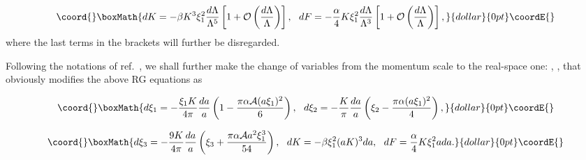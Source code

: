 \documentclass[a4paper,12pt]{article}
\begin{document}
$$\coord{}\boxMath{
dK=-\beta K^3\xi_1^2\frac{d\Lambda}{\Lambda^5}\left[1+{\cal O}\left(\frac{d\Lambda}{\Lambda}\right)\right],~~
dF=-\frac{\alpha}{4}K\xi_1^2\frac{d\Lambda}{\Lambda^3}\left[1+{\cal O}\left(\frac{d\Lambda}{\Lambda}\right)\right],
}{dollar}{0pt}\coordE{}$$
where the last terms in the brackets will further be disregarded.

Following the notations of ref.~\cite{kogut}, we shall further make the change of variables from the momentum scale
to the real-space one:
\coordHE{}, \coordHE{}, that obviously modifies the above RG equations as

$$\coord{}\boxMath{
d\xi_1=-\frac{\xi_1K}{4\pi}\frac{da}{a}\left(1-\frac{\pi\alpha{\cal A}(a\xi_1)^2}{6}\right),~~
d\xi_2=-\frac{K}{\pi}\frac{da}{a}\left(\xi_2-\frac{\pi\alpha (a\xi_1)^2}{4}\right),}{dollar}{0pt}\coordE{}$$

$$\coord{}\boxMath{d\xi_3=-\frac{9K}{4\pi}\frac{da}{a}\left(\xi_3+\frac{\pi\alpha{\cal A}a^2\xi_1^3}{54}\right),~~
dK=-\beta \xi_1^2(aK)^3da,~~ dF=\frac{\alpha}{4}K\xi_1^2ada.}{dollar}{0pt}\coordE{}$$
\end{document}
